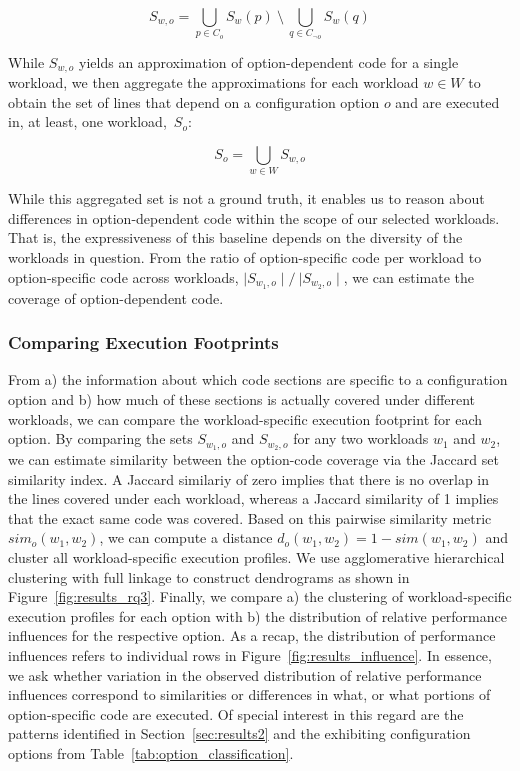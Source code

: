 \begin{equation}%
	S_{w, o} = \bigcup_{p \in C_{o}} S_{w}(p) ~ \setminus ~ \bigcup_{q \in C_{\neg o}} S_{w}(q)
\end{equation}

While $S_{w, o}$ yields an approximation of option-dependent code for a single workload, we then aggregate the approximations for each workload $w\in W$ to obtain the set of lines that depend on a configuration option $o$ and are executed in, at least, one workload,~$S_{o}$: 

\begin{equation}
	S_{o} = \bigcup_{w \in W} S_{w, o}
\end{equation}

While this aggregated set is not a ground truth, it enables us to reason about differences in option-dependent code within the scope of our selected workloads. That is, the expressiveness of this baseline depends on the diversity of the workloads in question. From the ratio of option-specific code per workload to option-specific code across workloads, $\mid S_{w_1, o}\mid/~{\mid S_{w_2, o}\mid}$, we can estimate the coverage of option-dependent code. 

\subsubsection{Comparing Execution Footprints}
From a) the information about which code sections are specific to a configuration option and b) how much of these sections is actually covered under different workloads, we can compare the workload-specific execution footprint for each option. By comparing the sets $S_{w_1, o}$ and $S_{w_2, o}$ for any two workloads $w_1$ and $w_2$, we can estimate similarity between the option-code coverage via the Jaccard set similarity index. A Jaccard similariy of zero implies that there is no overlap in the lines covered under each workload, whereas a Jaccard similarity of 1 implies that the exact same code was covered. Based on this pairwise similarity metric $sim_o(w_1, w_2)$, we can compute a distance $d_o(w_1, w_2) = 1 - sim(w_1, w_2)$ and cluster all workload-specific execution profiles. We use agglomerative hierarchical clustering with full linkage to construct dendrograms as shown in Figure~\ref{fig:results_rq3}. Finally, we compare a) the clustering of workload-specific execution profiles for each option with b) the distribution of relative performance influences for the respective option. As a recap, the distribution of performance influences refers to individual rows in Figure~\ref{fig:results_influence}. In essence, we ask whether variation in the observed distribution of relative performance influences correspond to similarities or differences in what, or what portions of option-specific code are executed. Of special interest in this regard are the patterns identified in Section~\ref{sec:results2} and the exhibiting configuration options from Table~\ref{tab:option_classification}.

